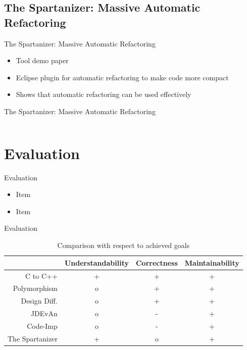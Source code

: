 \documentclass{beamer}
\begin{document}
\subsection{The Spartanizer: Massive Automatic Refactoring}

\begin{frame}{The Spartanizer: Massive Automatic Refactoring}
  \begin{itemize}
    \item Tool demo paper
    \item Eclipse plugin for automatic refactoring to make code more compact
    \pause
    \item Shows that automatic refactoring can be used effectively
  \end{itemize}
\end{frame}

\begin{frame}[fragile]{The Spartanizer: Massive Automatic Refactoring}
	\begin{columns}[T]
		\begin{column}{.49\textwidth}
			
		\end{column}
		\begin{column}{.5\textwidth}
			
		\end{column}
	\end{columns}
\end{frame}

\section{Evaluation}

\begin{frame}{Evaluation}	
	\begin{itemize}
		\item Item
		\item Item
	\end{itemize}
\end{frame}

\begin{frame}{Evaluation}	
	\begin{table}[htb]
		\centering
		\caption{Comparison with respect to achieved goals}
		\label{tbl:goals}
		\begin{tabular}{r|ccc}
			~               & Understandability & Correctness & Maintainability \\ \hline
			C to C++        & +                 & +           & + \\
			Polymorphism    & o                 & +           & + \\
			Design Diff.    & o                 & +           & + \\
			JDEvAn          & o                 & -           & + \\
			Code-Imp        & o                 & -           & + \\
			The Spartanizer & +                 & o           & + \\
		\end{tabular}
	\end{table}
\end{frame}
\end{document}

